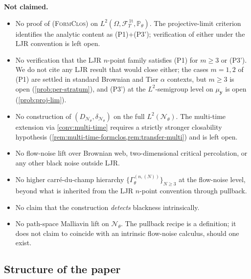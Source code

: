 \documentclass[11pt,reqno]{amsart}
\theoremstyle{plain}
\theoremstyle{definition}
\theoremstyle{remark}
\newcommand{\Prob}{\mathbb P}
\newcommand{\cF}{\mathcal F}
\newcommand{\cN}{\mathcal N}
\newcommand{\FT}{\cF_{T}^{\,\mathrm{1t}}}
\newcommand{\Hone}{L^{2}(\Omega,\FT,\Pth)}
\newcommand{\GamM}[1]{\Gamma^{(#1)}_{\theta}}
\newcommand{\DN}{D_{\cN_{\theta}}}
\newcommand{\divN}{\delta_{\cN_{\theta}}}
\newcommand{\Pth}{\Prob_{\theta}}
\begin{document}
\textbf{Not claimed.}
\begin{itemize}
\item No proof of {\normalfont\textsc{(FormClos)}} on $\Hone$. The
projective-limit criterion identifies the analytic content as
{\normalfont (P1)}+{\normalfont (P3')}; verification of either
under the LJR convention is left open.

\item No verification that the LJR $n$-point family satisfies
{\normalfont (P1)} for $m\ge 3$ or {\normalfont (P3')}. We do not
cite any LJR result that would close either; the cases $m=1,2$ of
{\normalfont (P1)} are settled in standard Brownian and Tier
$\alpha$ contexts, but $m\ge 3$ is open
(\cref{prob:per-stratum}), and {\normalfont (P3')} at the
$L^{2}$-semigroup level on $\mu_{\mathbf y}$ is open
(\cref{prob:proj-lim}).

\item No construction of $(\DN,\divN)$ on the full
$L^{2}(\cN_{\theta})$. The multi-time extension via
\cref{conv:multi-time} requires a strictly stronger closability
hypothesis (\cref{rem:multi-time-formclos,rem:transfer-multi}) and
is left open.

\item No flow-noise lift over Brownian web, two-dimensional
critical percolation, or any other black noise outside LJR.

\item No higher carr\'e-du-champ hierarchy
$\{\GamM{n,(N)}\}_{N\ge 3}$ at the flow-noise level, beyond what is
inherited from the LJR $n$-point convention through pullback.

\item No claim that the construction \emph{detects} blackness
intrinsically.

\item No path-space Malliavin lift on $\cN_{\theta}$. The pullback
recipe is a definition; it does not claim to coincide with an
intrinsic flow-noise calculus, should one exist.
\end{itemize}

\subsection{Structure of the paper}\label{sec:intro-structure}
\end{document}
